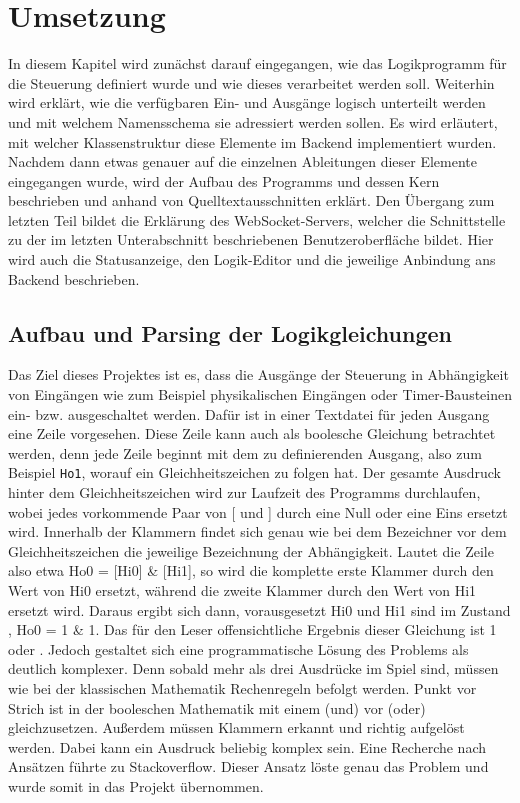 \section{Umsetzung}\label{kap:ums}
In diesem Kapitel wird zunächst darauf eingegangen, wie das Logikprogramm für die Steuerung definiert wurde und wie dieses verarbeitet werden soll. Weiterhin wird erklärt, wie die verfügbaren Ein- und Ausgänge logisch unterteilt werden und mit welchem Namensschema sie adressiert werden sollen. Es wird erläutert, mit welcher Klassenstruktur diese Elemente im Backend implementiert wurden. Nachdem dann etwas genauer auf die einzelnen Ableitungen dieser Elemente eingegangen wurde, wird der Aufbau des Programms und dessen Kern beschrieben und anhand von Quelltextausschnitten erklärt. Den Übergang zum letzten Teil bildet die Erklärung des WebSocket-Servers, welcher die Schnittstelle zu der im letzten Unterabschnitt beschriebenen Benutzeroberfläche bildet. Hier wird auch die Statusanzeige, den Logik-Editor und die jeweilige Anbindung ans Backend beschrieben.

\subsection{Aufbau und Parsing der Logikgleichungen}\label{kap:ums:parsing}
Das Ziel dieses Projektes ist es, dass die Ausgänge der Steuerung in Abhängigkeit von Eingängen wie zum Beispiel physikalischen Eingängen oder Timer-Bausteinen ein- bzw. ausgeschaltet werden. Dafür ist in einer Textdatei für jeden Ausgang eine Zeile vorgesehen. Diese Zeile kann auch als boolesche Gleichung betrachtet werden, denn jede Zeile beginnt mit dem zu definierenden Ausgang, also zum Beispiel \texttt{Ho1}, worauf ein Gleichheitszeichen zu folgen hat. Der gesamte Ausdruck hinter dem Gleichheitszeichen wird zur Laufzeit des Programms durchlaufen, wobei jedes vorkommende Paar von [ und ] durch eine Null oder eine Eins ersetzt wird. Innerhalb der Klammern findet sich genau wie bei dem Bezeichner vor dem Gleichheitszeichen die jeweilige Bezeichnung der Abhängigkeit. Lautet die Zeile also etwa Ho0 = [Hi0] \& [Hi1], so wird die komplette erste Klammer durch den Wert von Hi0 ersetzt, während die zweite Klammer durch den Wert von Hi1 ersetzt wird. Daraus ergibt sich dann, vorausgesetzt Hi0 und Hi1 sind im Zustand , Ho0 = 1 \& 1. Das für den Leser offensichtliche Ergebnis dieser Gleichung ist 1 oder . Jedoch gestaltet sich eine programmatische Lösung des Problems als deutlich komplexer. Denn sobald mehr als drei Ausdrücke im Spiel sind, müssen wie bei der klassischen Mathematik Rechenregeln befolgt werden. Punkt vor Strich ist in der booleschen Mathematik mit einem \wedge (und) vor \vee (oder) gleichzusetzen. Außerdem müssen Klammern erkannt und richtig aufgelöst werden. Dabei kann ein Ausdruck beliebig komplex sein. Eine Recherche nach Ansätzen führte zu Stackoverflow.\cite{URL:Parsing} Dieser Ansatz löste genau das Problem und wurde somit in das Projekt übernommen. 

